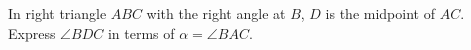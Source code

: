 In right triangle $ABC$ with the right angle at $B$, $D$ is the midpoint of $AC$. Express $\angle BDC$ in terms of $\alpha=\angle BAC$.
